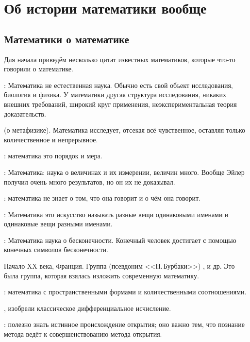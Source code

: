 \documentclass[a4paper,oneside,fleqn,10pt]{article}
\begin{document}
\tableofcontents


\section{Об истории математики вообще}

\subsection{Математики о математике}

Для начала приведём несколько цитат известных математиков,
которые что-то говорили о математике.

: Математика не естественная наука. Обычно есть свой
объект исследования, биология и физика. У математики другая
структура исследования, никаких внешних требований,
широкий круг применения, неэкспериментальная теория доказательств.

 (о метафизике). Математика исследует, отсекая всё чувственное,
оставляя только количественное и непрерывное.

: математика это порядок и мера.

: Математика: наука о величинах и их измерении, величин много.
Вообще Эйлер получил очень много результатов, но он их
не доказывал.

: математика не знает о том, что она говорит и о чём она говорит.

: Математика это искусство называть разные вещи одинаковыми именами
и одинаковые вещи разными именами.

: Математика наука о бесконечности. Конечный человек
достигает с помощью конечных символов бесконечности.

Начало XX века, Франция. Группа  (псевдоним <<Н.\,Бурбаки>>) ,
 и др. Это была группа, которая взялась изложить современную
математику.

: математика  с пространственными формами
и количественными соотношениями.

, 
изобрели классическое дифференциальное исчисление.

: полезно знать истинное происхождение открытия; оно важно тем,
что познание метода ведёт к совершенствованию метода открытия.
\end{document}
